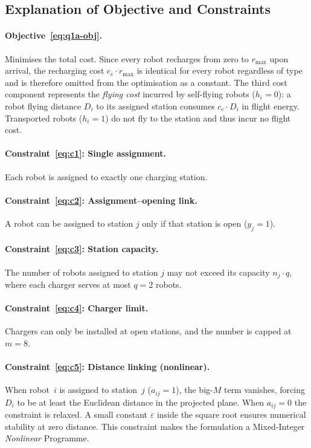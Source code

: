 \documentclass[11pt,a4paper]{article}
\begin{document}
\subsection{Explanation of Objective and Constraints}
\label{sec:q1a-explain}

\paragraph{Objective~\eqref{eq:q1a-obj}.}
Minimises the total cost.
Since every robot recharges from zero to $r_{\max}$ upon arrival, the recharging cost $c_c \cdot r_{\max}$ is identical for every robot regardless of type and is therefore omitted from the optimisation as a constant.
The third cost component represents the \emph{flying cost} incurred by self-flying robots ($h_i = 0$): a robot flying distance $D_i$ to its assigned station consumes $c_c \cdot D_i$ in flight energy.
Transported robots ($h_i = 1$) do not fly to the station and thus incur no flight cost.

\paragraph{Constraint~\eqref{eq:c1}: Single assignment.}
Each robot is assigned to exactly one charging station.

\paragraph{Constraint~\eqref{eq:c2}: Assignment--opening link.}
A robot can be assigned to station $j$ only if that station is open ($y_j = 1$).

\paragraph{Constraint~\eqref{eq:c3}: Station capacity.}
The number of robots assigned to station $j$ may not exceed its capacity $n_j \cdot q$, where each charger serves at most $q = 2$ robots.

\paragraph{Constraint~\eqref{eq:c4}: Charger limit.}
Chargers can only be installed at open stations, and the number is capped at $m = 8$.

\paragraph{Constraint~\eqref{eq:c5}: Distance linking (nonlinear).}
When robot~$i$ is assigned to station~$j$ ($a_{ij}=1$), the big-$M$ term vanishes, forcing $D_i$ to be at least the Euclidean distance in the projected plane.
When $a_{ij}=0$ the constraint is relaxed.
A small constant $\varepsilon$ inside the square root ensures numerical stability at zero distance.
This constraint makes the formulation a Mixed-Integer \emph{Nonlinear} Programme.
\end{document}
